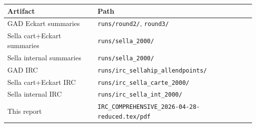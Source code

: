 \documentclass[11pt]{article}
\begin{document}
\begin{center}
\begin{tabular}{ll}
\toprule
Artifact & Path \\
\midrule
GAD Eckart summaries           & \texttt{runs/round2/}, \texttt{round3/} \\
Sella cart+Eckart summaries    & \texttt{runs/sella\_2000/} \\
Sella internal summaries       & \texttt{runs/sella\_2000/} \\
GAD IRC                        & \texttt{runs/irc\_sellahip\_allendpoints/} \\
Sella cart+Eckart IRC          & \texttt{runs/irc\_sella\_carte\_2000/} \\
Sella internal IRC             & \texttt{runs/irc\_sella\_int\_2000/} \\
This report                    & \texttt{IRC\_COMPREHENSIVE\_2026-04-28-reduced.tex/pdf} \\
\bottomrule
\end{tabular}
\end{center}
\end{document}
